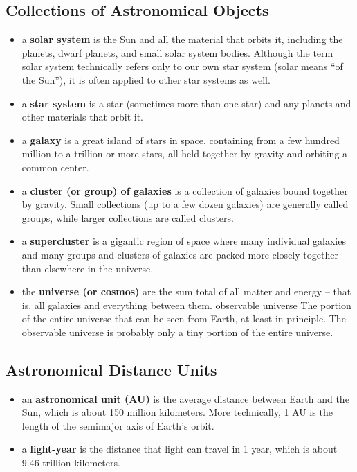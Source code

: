 \documentclass[12pt]{article}
\begin{document}
\subsection{Collections of Astronomical Objects}
\begin{itemize}
\item a {\bf solar system} is the Sun and all the material that orbits it, including the planets, dwarf planets, and small solar system bodies. Although the term solar system technically refers only to our own star system (solar means “of the Sun”), it is often applied to other star systems as well.
\item a {\bf star system} is a star (sometimes more than one star) and any planets and other materials that orbit it.
\item a {\bf galaxy} is a great island of stars in space, containing from a few hundred million to a trillion or more stars, all held together by gravity and
orbiting a common center.
\item a {\bf cluster (or group) of galaxies} is a collection of galaxies bound together by gravity. Small collections (up to a few dozen galaxies)
are generally called groups, while larger collections are called clusters.
\item a {\bf supercluster} is a gigantic region of space where many individual galaxies and many groups and clusters of galaxies are packed more
closely together than elsewhere in the universe.
\item the {\bf universe (or cosmos)} are the sum total of all matter and energy -- that is, all galaxies and everything between them.
observable universe The portion of the entire universe that can be seen from Earth, at least in principle. The observable universe is
probably only a tiny portion of the entire universe.
\end{itemize}

\subsection{Astronomical Distance Units}
\begin{itemize}
\item an {\bf astronomical unit (AU)} is the average distance between Earth and the Sun, which is about 150 million kilometers. More technically,
1 AU is the length of the semimajor axis of Earth’s orbit.
\item a {\bf light-year} is the distance that light can travel in 1 year, which is about 9.46 trillion kilometers.
\end{itemize}
\end{document}
